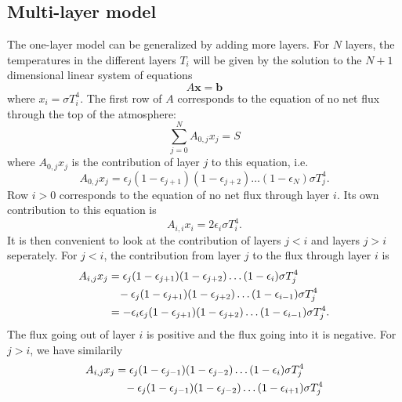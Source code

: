 \documentclass[twocolumn]{article}
\begin{document}
\begin{large}
\subsection*{Multi-layer model}
The one-layer model can be generalized by adding more layers. For $N$ layers, the temperatures in the different layers $T_i$ will be given by the solution to the $N+1$ dimensional linear system of equations
\begin{equation}
    A\mathbf{x} = \mathbf{b}
\end{equation}
where $x_i = \sigma T^4_i$. The first row of $A$ corresponds to the equation of no net flux through the top of the atmosphere:
\begin{equation}
    \sum_{j=0}^{N}A_{0,j}x_j = S
\end{equation}
where $A_{0,j}x_j$ is the contribution of layer $j$ to this equation, i.e.
\begin{equation}
    A_{0,j}x_j = \epsilon_j(1-\epsilon_{j+1})(1-\epsilon_{j+2})\dots(1-\epsilon_{N})\sigma T_j^4.
\end{equation}
Row $i>0$ corresponds to the equation of no net flux through layer $i$. Its own contribution to this equation is
\begin{equation}
    A_{i,i}x_i = 2\epsilon_i\sigma T_i^4.
\end{equation}
It is then convenient to look at the contribution of layers $j<i$ and layers $j>i$ seperately. For $j<i$, the contribution from layer $j$ to the flux through layer $i$ is 
\begin{equation}
    \begin{split}
        A_{i,j}x_j &= \epsilon_j(1-\epsilon_{j+1})(1-\epsilon_{j+2})\dots(1-\epsilon_{i})\sigma T_j^4 \\ 
        &\hspace{0.3cm} -\epsilon_j(1-\epsilon_{j+1})(1-\epsilon_{j+2})\dots(1-\epsilon_{i-1})\sigma T_j^4 \\ 
        &= -\epsilon_i\epsilon_j(1-\epsilon_{j+1})(1-\epsilon_{j+2})\dots(1-\epsilon_{i-1})\sigma T_j^4.
    \end{split}
\end{equation}
The flux going out of layer $i$ is positive and the flux going into it is negative. For $j>i$, we have similarily
\begin{equation}
    \begin{split}
        A_{i,j}x_j &= \epsilon_j(1-\epsilon_{j-1})(1-\epsilon_{j-2})\dots(1-\epsilon_{i})\sigma T_j^4 \\ 
        &\hspace{0.3cm} -\epsilon_j(1-\epsilon_{j-1})(1-\epsilon_{j-2})\dots(1-\epsilon_{i+1})\sigma T_j^4 \\ 

\end{split}
\end{equation}
\end{large}
\end{document}

